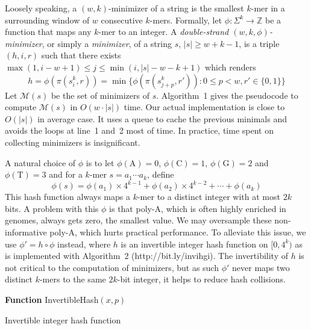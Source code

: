 \documentclass{bioinfo}
\begin{document}
\begin{methods}
Loosely speaking, a $(w,k)$-minimizer of a string is the
smallest $k$-mer in a surrounding window of $w$ consecutive $k$-mers. Formally,
let $\phi:\Sigma^k\to\mathbb{Z}$ be a function that maps any $k$-mer to an integer.
A \emph{double-strand $(w,k,\phi)$-minimizer}, or simply a \emph{minimizer}, of a
string $s$, $|s|\ge w+k-1$, is a triple $(h,i,r)$ such that there exists
$\max(1,i-w+1)\le j\le\min(i,|s|-w-k+1)$ which renders
$$
h=\phi(\pi(s_i^k,r))=\min\big\{\phi(\pi(s_{j+p}^k,r')):0\le p<w,r'\in\{0,1\}\big\}
$$
Let $\mathcal{M}(s)$ be the set of minimizers of $s$.  Algorithm~1 gives the
pseudocode to compute $\mathcal{M}(s)$ in $O(w\cdot|s|)$ time.  Our actual
implementation is close to $O(|s|)$ in average case. It uses a queue to cache
the previous minimals and avoids the loops at line~1 and~2 most of time. In
practice, time spent on collecting minimizers is insignificant.

A natural choice of $\phi$ is to let $\phi(\mathrm{A})=0$,
$\phi(\mathrm{C})=1$, $\phi(\mathrm{G})=2$ and $\phi(\mathrm{T})=3$ and for a
$k$-mer $s=a_1\cdots a_k$, define
$$
\phi(s)=\phi(a_1)\times4^{k-1}+\phi(a_2)\times4^{k-2}+\cdots+\phi(a_k)
$$
This hash function always maps a $k$-mer to a distinct integer with at most $2k$ bits. A problem with this $\phi$ is
that poly-A, which is often highly enriched in genomes, always gets zero, the
smallest value. We may oversample these non-informative poly-A, which 
hurts practical performance. To alleviate this issue, we use $\phi'=h\circ\phi$
instead, where $h$ is an invertible integer hash function on $[0,4^k)$ as is
implemented with Algorithm~2 (http://bit.ly/invihgi). The invertibility of $h$
is not critical to the computation of minimizers, but as such $\phi'$ never
maps two distinct $k$-mers to the same $2k$-bit integer, it helps to reduce
hash collisions.

\begin{algorithm}[tb]
\DontPrintSemicolon
\footnotesize
{}
\BlankLine
\textbf{Function} {\sc InvertibleHash}$(x,p)$
\caption{Invertible integer hash function}
\end{algorithm}


\end{methods}
\end{document}
